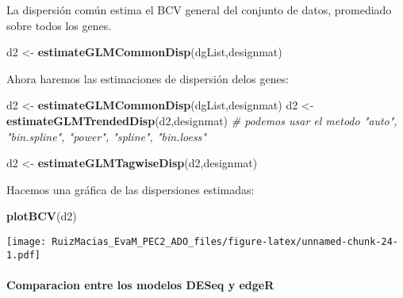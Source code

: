 \documentclass[
]{article}
\newenvironment{Shaded}{\begin{snugshade}}{\end{snugshade}}
\newcommand{\CommentTok}[1]{\textcolor[rgb]{0.56,0.35,0.01}{\textit{#1}}}
\newcommand{\KeywordTok}[1]{\textcolor[rgb]{0.13,0.29,0.53}{\textbf{#1}}}
\newcommand{\NormalTok}[1]{#1}
\newcommand{\OperatorTok}[1]{\textcolor[rgb]{0.81,0.36,0.00}{\textbf{#1}}}
\newcommand{\StringTok}[1]{\textcolor[rgb]{0.31,0.60,0.02}{#1}}
\begin{document}
\begin{Shaded}
\end{Shaded}

La dispersión común estima el BCV general del conjunto de datos,
promediado sobre todos los genes.

\begin{Shaded}
\begin{Highlighting}[]
\NormalTok{d2 <-}\StringTok{ }\KeywordTok{estimateGLMCommonDisp}\NormalTok{(dgList,designmat)}
\end{Highlighting}
\end{Shaded}

Ahora haremos las estimaciones de dispersión delos genes:

\begin{Shaded}
\begin{Highlighting}[]
\NormalTok{d2 <-}\StringTok{ }\KeywordTok{estimateGLMCommonDisp}\NormalTok{(dgList,designmat)}
\NormalTok{d2 <-}\StringTok{ }\KeywordTok{estimateGLMTrendedDisp}\NormalTok{(d2,designmat)}
\CommentTok{# podemos usar el metodo "auto", "bin.spline", "power", "spline", "bin.loess"}

\NormalTok{d2 <-}\StringTok{ }\KeywordTok{estimateGLMTagwiseDisp}\NormalTok{(d2,designmat)}
\end{Highlighting}
\end{Shaded}

Hacemos una gráfica de las dispersiones estimadas:

\begin{Shaded}
\begin{Highlighting}[]
\KeywordTok{plotBCV}\NormalTok{(d2)}
\end{Highlighting}
\end{Shaded}

\texttt{[image: RuizMacias\_EvaM\_PEC2\_ADO\_files/figure-latex/unnamed-chunk-24-1.pdf]}

\hypertarget{comparacion-entre-los-modelos-deseq-y-edger}{%
\paragraph{Comparacion entre los modelos DESeq y
edgeR}\label{comparacion-entre-los-modelos-deseq-y-edger}}
\end{document}
